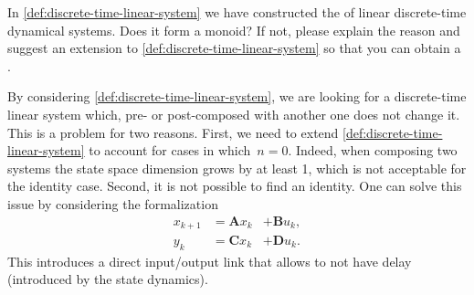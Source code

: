 \begin{exercise}
    In \cref{def:discrete-time-linear-system} we have constructed the  of linear discrete-time dynamical systems.
    Does it form a monoid?
    If not, please explain the reason and suggest an extension to \cref{def:discrete-time-linear-system} so that you can obtain a .
\end{exercise}
\begin{solution}
    By considering \cref{def:discrete-time-linear-system}, we are looking for a discrete-time linear system which, pre- or post-composed with another one does not change it.
    This is a problem for two reasons.
    First, we need to extend \cref{def:discrete-time-linear-system} to account for cases in which~$n=0$.
    Indeed, when composing two systems the state space dimension grows by at least 1, which is not acceptable for the identity case.
    Second, it is not possible to find an identity.
    One can solve this issue by considering the formalization
    \begin{equation}
        \label{eq:linear-discrete-time-dynamics-D}
        \begin{aligned}
            x_{k+1} & = \mathbf{A} x_k & + \mathbf{B} u_k, \\
            y_{k}   & = \mathbf{C} x_k & + \mathbf{D} u_k.
        \end{aligned}
    \end{equation}
    This introduces a direct input/output link that allows to not have delay (introduced by the state dynamics).
\end{solution}

